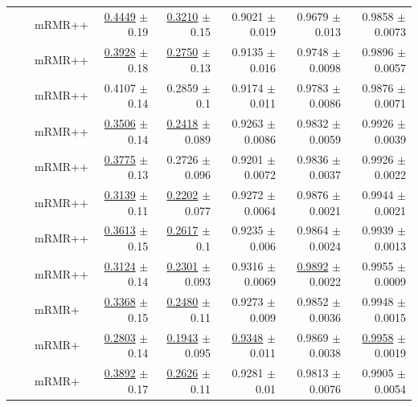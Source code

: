 \begin{longtable}{llp{}rrrrr}
 &  & mRMR++ & \underline{0.4449} {\scriptsize $\pm$ 0.19} & \underline{0.3210} {\scriptsize $\pm$ 0.15} & 0.9021 {\scriptsize $\pm$ 0.019} & 0.9679 {\scriptsize $\pm$ 0.013} & 0.9858 {\scriptsize $\pm$ 0.0073} \\
 &  & mRMR++ & \underline{0.3928} {\scriptsize $\pm$ 0.18} & \underline{0.2750} {\scriptsize $\pm$ 0.13} & 0.9135 {\scriptsize $\pm$ 0.016} & 0.9748 {\scriptsize $\pm$ 0.0098} & 0.9896 {\scriptsize $\pm$ 0.0057} \\
 &  & mRMR++ & 0.4107 {\scriptsize $\pm$ 0.14} & 0.2859 {\scriptsize $\pm$ 0.1} & 0.9174 {\scriptsize $\pm$ 0.011} & 0.9783 {\scriptsize $\pm$ 0.0086} & 0.9876 {\scriptsize $\pm$ 0.0071} \\
 &  & mRMR++ & \underline{0.3506} {\scriptsize $\pm$ 0.14} & \underline{0.2418} {\scriptsize $\pm$ 0.089} & 0.9263 {\scriptsize $\pm$ 0.0086} & 0.9832 {\scriptsize $\pm$ 0.0059} & 0.9926 {\scriptsize $\pm$ 0.0039} \\
 &  & mRMR++ & \underline{0.3775} {\scriptsize $\pm$ 0.13} & 0.2726 {\scriptsize $\pm$ 0.096} & 0.9201 {\scriptsize $\pm$ 0.0072} & 0.9836 {\scriptsize $\pm$ 0.0037} & 0.9926 {\scriptsize $\pm$ 0.0022} \\
 &  & mRMR++ & \underline{0.3139} {\scriptsize $\pm$ 0.11} & \underline{0.2202} {\scriptsize $\pm$ 0.077} & 0.9272 {\scriptsize $\pm$ 0.0064} & 0.9876 {\scriptsize $\pm$ 0.0021} & 0.9944 {\scriptsize $\pm$ 0.0021} \\
 &  & mRMR++ & \underline{0.3613} {\scriptsize $\pm$ 0.15} & \underline{0.2617} {\scriptsize $\pm$ 0.1} & 0.9235 {\scriptsize $\pm$ 0.006} & 0.9864 {\scriptsize $\pm$ 0.0024} & 0.9939 {\scriptsize $\pm$ 0.0013} \\
 &  & mRMR++ & \underline{0.3124} {\scriptsize $\pm$ 0.14} & \underline{0.2301} {\scriptsize $\pm$ 0.093} & 0.9316 {\scriptsize $\pm$ 0.0069} & \underline{0.9892} {\scriptsize $\pm$ 0.0022} & 0.9955 {\scriptsize $\pm$ 0.0009} \\
 &  & mRMR+ & \underline{0.3368} {\scriptsize $\pm$ 0.15} & \underline{0.2480} {\scriptsize $\pm$ 0.11} & 0.9273 {\scriptsize $\pm$ 0.009} & 0.9852 {\scriptsize $\pm$ 0.0036} & 0.9948 {\scriptsize $\pm$ 0.0015} \\
 &  & mRMR+ & \underline{0.2803} {\scriptsize $\pm$ 0.14} & \underline{0.1943} {\scriptsize $\pm$ 0.095} & \underline{0.9348} {\scriptsize $\pm$ 0.011} & 0.9869 {\scriptsize $\pm$ 0.0038} & \underline{0.9958} {\scriptsize $\pm$ 0.0019} \\
 &  & mRMR+ & \underline{0.3892} {\scriptsize $\pm$ 0.17} & \underline{0.2626} {\scriptsize $\pm$ 0.11} & 0.9281 {\scriptsize $\pm$ 0.01} & 0.9813 {\scriptsize $\pm$ 0.0076} & 0.9905 {\scriptsize $\pm$ 0.0054} \\

\end{longtable}
